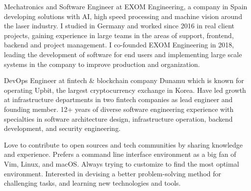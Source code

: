 

\begin{cvparagraph}

Mechatronics and Software Engineer at EXOM Engineering, a company in Spain developing solutions with AI, high speed processing and machine vision around the laser industry. I studied in Germany and worked since 2016 in real client projects, gaining experience in large teams in the areas of support, frontend, backend and project management. I co-founded EXOM Engineering in 2018, leading the development of software for end users and implementing large scale systems in the company to improve production and organization. 

  

DevOps Engineer at fintech \& blockchain company Dunamu which is known for operating Upbit, the largest cryptocurrency exchange in Korea. Have led growth at infrastructure departments in two fintech companies as lead engineer and founding member. 12+ years of diverse software engineering experience with specialties in software architecture design, infrastructure operation, backend development, and security engineering.

Love to contribute to open sources and tech communities by sharing knowledge and experience. Prefers a command line interface environment as a big fan of Vim, Linux, and macOS. Always trying to customize to find the most optimal environment. Interested in devising a better problem-solving method for challenging tasks, and learning new technologies and tools.
\end{cvparagraph}
